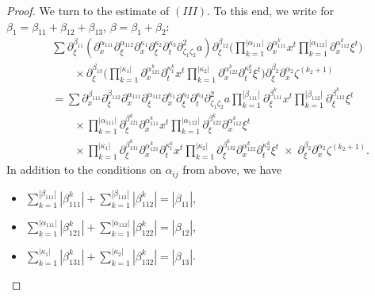 \documentclass{amsart}
\theoremstyle{definition}
\begin{document}
\begin{proof}
We turn to the estimate of $(III)$. To this end, we write for $\beta_1 = \beta_{11} + \beta_{12} + \beta_{13}$, $\beta = \beta_1 + \beta_2$:
\begin{equation*}
\begin{split}
&\sum \partial_{\xi}^{\beta_{11}} (\partial_x^{\alpha_{111}} \partial_{\xi}^{\alpha_{112}} \partial_x^{\kappa_1} \partial_{\xi}^{\kappa_2} \partial_t^{\kappa_3} \partial^2_{\zeta_1 \zeta_2} a) \partial_{\xi}^{\beta_{12}} \big( \prod_{k=1}^{|\alpha_{111}|} \partial_x^{\alpha_{111}^k} x^t \prod_{k=1}^{|\alpha_{112}|} \partial_x^{\alpha_{112}^k} \xi^t \big) \\
&\quad \quad \times \partial_{\xi}^{\beta_{13}} \big( \prod_{k=1}^{|\kappa_1|} \partial_x^{\alpha_{121}^k} \partial_t^{\kappa_1^k} x^t \prod_{k=1}^{|\kappa_2|} \partial_x^{\alpha_{122}^k} \partial_t^{\kappa_2^k} \xi^t \big) \partial_{\xi}^{\beta_2} \partial_x^{\alpha_2} \zeta^{(k_2+1)} \\
&= \sum \partial_x^{\beta_{111}} \partial_{\xi}^{\beta_{112}} \partial_x^{\alpha_{111}} \partial_{\xi}^{\alpha_{112}} \partial_x^{\kappa_1} \partial_{\xi}^{\kappa_2} \partial_t^{\kappa_3} \partial^2_{\zeta_1 \zeta_2} a \prod_{k=1}^{|\beta_{111}|} \partial_{\xi}^{\beta_{111}^k} x^t \prod_{k=1}^{|\beta_{112}|} \partial_{\xi}^{\beta_{112}^k} \xi^t \\
&\quad \quad \times \prod_{k=1}^{|\alpha_{111}|} \partial_{\xi}^{\beta_{121}^k} \partial_x^{\alpha_{111}^k} x^t \prod_{k=1}^{|\alpha_{112}|} \partial_{\xi}^{\beta_{122}^k} \partial_x^{\alpha_{112}^k} \xi^t \\
&\quad \quad \times \prod_{k=1}^{|\kappa_1|} \partial_{\xi}^{\beta_{131}^k} \partial_x^{\alpha_{121}^k} \partial_t^{\kappa_1^k} x^t \prod_{k=1}^{|\kappa_2|} \partial_{\xi}^{\beta_{132}^k} \partial_x^{\alpha_{122}^k} \partial_t^{\kappa_2^k} \xi^t \; \times \; \partial_{\xi}^{\beta_2} \partial_x^{\alpha_2} \zeta^{(k_2+1)}.
\end{split}
\end{equation*}
In addition to the conditions on $\alpha_{ij}$ from above, we have
\begin{itemize}
\item $\sum_{k=1}^{|\beta_{111}|} |\beta_{111}^k| + \sum_{k=1}^{|\beta_{112}|} |\beta_{112}^k| = |\beta_{11}|$, 
\item $\sum_{k=1}^{|\alpha_{111}|} |\beta_{121}^k| + \sum_{k=1}^{|\alpha_{112}|} |\beta_{122}^k| = |\beta_{12}|$,
\item $\sum_{k=1}^{|\kappa_1|} |\beta_{131}^k| + \sum_{k=1}^{|\kappa_2|} |\beta_{132}^k| = |\beta_{13}|$.
\end{itemize}


\end{proof}
\end{document}
